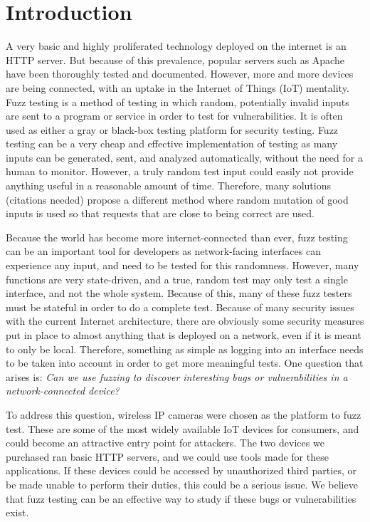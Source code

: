 \documentclass[letterpaper,twocolumn,10pt]{article}
\begin{document}
\section{Introduction}

A very basic and highly proliferated technology deployed on the internet is an HTTP server. But because of this prevalence, popular servers such as Apache have been thoroughly tested and documented. However, more and more devices are being connected, with an uptake in the Internet of Things (IoT) mentality. 
Fuzz testing is a method of testing in which random, potentially invalid inputs are sent to a program or service in order to test for vulnerabilities. It is often used as either a gray or black-box testing platform for security testing. Fuzz testing can be a very cheap and effective implementation of testing as many inputs can be generated, sent, and analyzed automatically, without the need for a human to monitor. However, a truly random test input could easily not provide anything useful in a reasonable amount of time. Therefore, many solutions (citations needed) propose a different method where random mutation of good inputs is used so that requests that are close to being correct are used.

Because the world has become more internet-connected than ever, fuzz testing can be an important tool for developers as network-facing interfaces can experience any input, and need to be tested for this randomness. However, many functions are very state-driven, and a true, random test may only test a single interface, and not the whole system. Because of this, many of these fuzz testers must be stateful in order to do a complete test. Because of many security issues with the current Internet architecture, there are obviously some security measures put in place to almost anything that is deployed on a network, even if it is meant to only be local. Therefore, something as simple as logging into an interface needs to be taken into account in order to get more meaningful tests. One question that arises is: \textit{Can we use fuzzing to discover interesting bugs or vulnerabilities in a network-connected device?} 

To address this question, wireless IP cameras were chosen as the platform to fuzz test. These are some of the most widely available IoT devices for consumers, and could become an attractive entry point for attackers. The two devices we purchased ran basic HTTP servers, and we could use tools made for these applications. If these devices could be accessed by unauthorized third parties, or be made unable to perform their duties, this could be a serious issue. We believe that fuzz testing can be an effective way to study if these bugs or vulnerabilities exist. 
\end{document}
